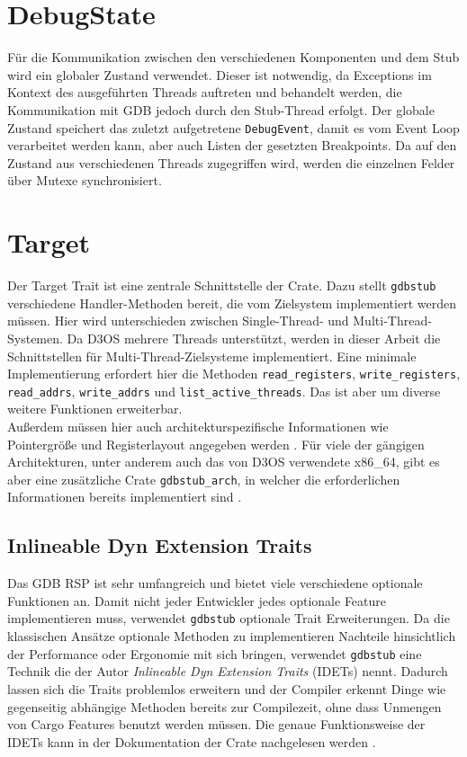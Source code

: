\section{DebugState} 
Für die Kommunikation zwischen den verschiedenen Komponenten und dem Stub wird ein globaler Zustand verwendet. Dieser ist notwendig, da Exceptions im Kontext des ausgeführten Threads auftreten und behandelt werden, die Kommunikation mit GDB jedoch durch den Stub-Thread erfolgt. Der globale Zustand speichert das zuletzt aufgetretene \texttt{DebugEvent}, damit es vom Event Loop verarbeitet werden kann, aber auch Listen der gesetzten Breakpoints. Da auf den Zustand aus verschiedenen Threads zugegriffen wird, werden die einzelnen Felder über Mutexe synchronisiert. 

\section{Target}
Der Target Trait ist eine zentrale Schnittstelle der Crate. Dazu stellt \texttt{gdbstub} verschiedene Handler-Methoden bereit, die vom Zielsystem implementiert werden müssen. Hier wird unterschieden zwischen Single-Thread- und Multi-Thread-Systemen. Da D3OS mehrere Threads unterstützt, werden in dieser Arbeit die Schnittstellen für Multi-Thread-Zielsysteme implementiert. Eine minimale Implementierung erfordert hier die Methoden \texttt{read\_registers}, \texttt{write\_registers}, \texttt{read\_addrs}, \texttt{write\_addrs} und \texttt{list\_active\_threads}. Das ist aber um diverse weitere Funktionen erweiterbar.\\
Außerdem müssen hier auch architekturspezifische Informationen wie Pointergröße und Registerlayout angegeben werden \cite{gdbstub}. Für viele der gängigen Architekturen, unter anderem auch das von D3OS verwendete x86\_64, gibt es aber eine zusätzliche Crate \texttt{gdbstub\_arch}, in welcher die erforderlichen Informationen bereits implementiert sind \cite{gdbstub-arch}.

\subsection{Inlineable Dyn Extension Traits}
Das GDB RSP ist sehr umfangreich und bietet viele verschiedene optionale Funktionen an. Damit nicht jeder Entwickler jedes optionale Feature implementieren muss, verwendet \texttt{gdbstub} optionale Trait Erweiterungen. Da die klassischen Ansätze optionale Methoden zu implementieren Nachteile hinsichtlich der Performance oder Ergonomie mit sich bringen, verwendet \texttt{gdbstub} eine Technik die der Autor \textit{Inlineable Dyn Extension Traits} (IDETs) nennt. Dadurch lassen sich die Traits problemlos erweitern und der Compiler erkennt Dinge wie gegenseitig abhängige Methoden bereits zur Compilezeit, ohne dass Unmengen von Cargo Features benutzt werden müssen. Die genaue Funktionsweise der IDETs kann in der Dokumentation der Crate nachgelesen werden \cite{gdbstub}.

